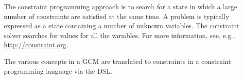 The constraint programming approach is to search for a state in which
a large number of constraints are satisfied at the same time.
%
A problem is typically expressed as a state containing a number of
unknown variables.
%
The constraint solver searches for values for all the variables.
%
For more information, see, e.g., \url{http://constraint.org}.

The various concepts in a \ac{GCM} are translated to constraints in a
constraint programming language via the \ac{DSL}.







